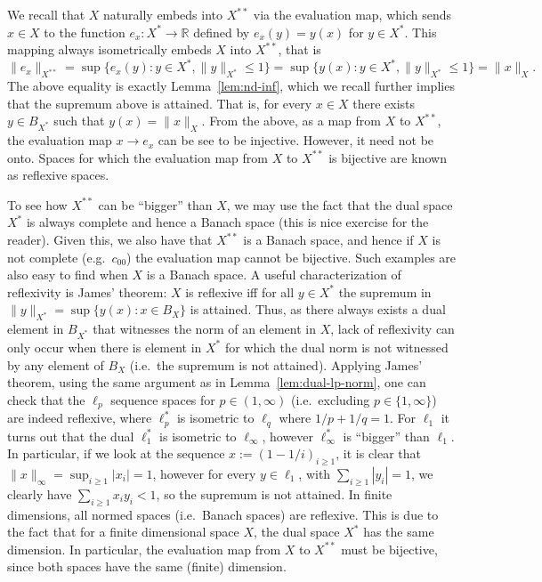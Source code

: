 \documentclass[11pt]{article}
\theoremstyle{plain}
\theoremstyle{plain}
\newcommand{\set}[1]{\{{#1}\}}
\newcommand{\R}{\ensuremath{\mathbb{R}}}
\begin{document}
We recall that $X$ naturally embeds into $X^{**}$ via the evaluation map, which
sends $x \in X$ to the function $e_x: X^* \rightarrow \R$ defined by $e_x(y) =
y(x)$ for $y \in X^*$. This mapping always isometrically embeds $X$ into
$X^{**}$, that is
\[
\|e_x\|_{X^{**}} = \sup \set{e_x(y): y \in X^*, \|y\|_{X^*} \leq 1} = \sup
\set{y(x): y \in X^*, \|y\|_{X^*} \leq 1} = \|x\|_X.
\]
The above equality is exactly Lemma~\ref{lem:nd-inf}, which we recall further
implies that the supremum above is attained. That is, for every $x \in X$ there
exists $y \in B_{X^*}$ such that $y(x) = \|x\|_X$. From the above, as a map from
$X$ to $X^{**}$, the evaluation map $x \rightarrow e_x$ can be see to be
injective. However, it need not be onto. Spaces for which the evaluation map
from $X$ to $X^{**}$ is bijective are known as reflexive spaces. 

To see how $X^{**}$ can be ``bigger'' than $X$, we may use the fact that the
dual space $X^*$ is always complete and hence a Banach space (this is nice
exercise for the reader). Given this, we also have that $X^{**}$ is a Banach
space, and hence if $X$ is not complete (e.g.~$c_{00}$) the evaluation map
cannot be bijective. Such examples are also easy to find when $X$ is a Banach
space. A useful characterization of reflexivity is James' theorem: $X$ is
reflexive iff for all $y \in X^*$ the supremum in $\|y\|_{X^*} = \sup \set{y(x):
x \in B_X}$ is attained. Thus, as there always exists a dual element in
$B_{X^*}$ that witnesses the norm of an element in $X$, lack of reflexivity can
only occur when there is element in $X^*$ for which the dual norm is not
witnessed by any element of $B_X$ (i.e.~the supremum is not attained). Applying
James' theorem, using the same argument as in Lemma~\ref{lem:dual-lp-norm}, one
can check that the $\ell_p$ sequence spaces for $p \in (1,\infty)$
(i.e.~excluding $p \in \set{1,\infty}$) are indeed reflexive, where $\ell_p^*$
is isometric to $\ell_q$ where $1/p+1/q=1$. For $\ell_1$ it turns out that the
dual $\ell_1^*$ is isometric to $\ell_\infty$, however $\ell_\infty^*$ is
``bigger'' than $\ell_1$. In particular, if we look at the sequence $x :=
(1-1/i)_{i \geq 1}$, it is clear that $\|x\|_\infty = \sup_{i \geq 1} |x_i| =
1$, however for every $y \in \ell_1$, with $\sum_{i \geq 1} |y_i| = 1$, we
clearly have $\sum_{i \geq 1} x_i y_i < 1$, so the supremum is not attained.  In
finite dimensions, all normed spaces (i.e.~Banach spaces) are reflexive. This is
due to the fact that for a finite dimensional space $X$, the dual space $X^*$
has the same dimension. In particular, the evaluation map from $X$ to $X^{**}$
must be bijective, since both spaces have the same (finite) dimension. 
\end{document}
